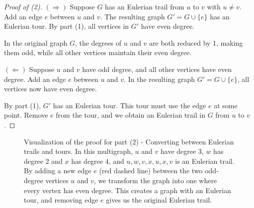 \documentclass{article}
\theoremstyle{definition}
\begin{document}
\begin{proof}[Proof of (2)]
$(\Rightarrow)$ Suppose $G$ has an Eulerian trail from $u$ to $v$ with $u \neq v$. Add an edge $e$ between $u$ and $v$. The resulting graph $G' = G \cup \{e\}$ has an Eulerian tour. By part (1), all vertices in $G'$ have even degree.

In the original graph $G$, the degrees of $u$ and $v$ are both reduced by 1, making them odd, while all other vertices maintain their even degree.

$(\Leftarrow)$ Suppose $u$ and $v$ have odd degree, and all other vertices have even degree. Add an edge $e$ between $u$ and $v$. In the resulting graph $G' = G \cup \{e\}$, all vertices now have even degree.

By part (1), $G'$ has an Eulerian tour. This tour must use the edge $e$ at some point. Remove $e$ from the tour, and we obtain an Eulerian trail in $G$ from $u$ to $v$.
\end{proof}

\begin{figure}[ht]
\centering
{}
\caption{Visualization of the proof for part (2) - Converting between Eulerian trails and tours. In this multigraph, $u$ and $v$ have degree 3, $w$ has degree 2 and $x$ has degree 4, and $u, w, v, x, u, x, v$ is an Eulerian trail. By adding a new edge $e$ (red dashed line) between the two odd-degree vertices $u$ and $v$, we transform the graph into one where every vertex has even degree. This creates a graph with an Eulerian tour, and removing edge $e$ gives us the original Eulerian trail.}
\label{fig:euler-trail-from-tour}
\end{figure}
\end{document}
